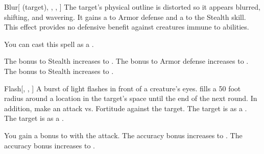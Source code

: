 \lowercase{\hypertarget{spell:Blur}{}}\label{spell:Blur}
\begin{attuneability}[Rank 1]{\hypertarget{spell:Blur}{Blur}}[ (target), , , ]
The target's physical outline is distorted so it appears blurred, shifting, and wavering.
It gains a   to Armor defense and a   to the Stealth skill.
This effect provides no defensive benefit against creatures immune to  abilities.

You can cast this spell as a .

\rankline
{} The bonus to Stealth increases to .
 The bonus to Armor defense increases to .
 The bonus to Stealth increases to .
\end{attuneability}
\vspace{0.25em}



\lowercase{\hypertarget{spell:Flash}{}}\label{spell:Flash}
\begin{freeability}[Rank 1]{\hypertarget{spell:Flash}{Flash}}[, , ]
A burst of light flashes in front of a creature's eyes.
 fills a 50 foot radius around a location in the target's space until the end of the next round.
In addition, make an attack vs. Fortitude against the target.
\hit The target is  as a .
\crit The target is  as a .

\rankline
{} You gain a  bonus to  with the attack.
 The accuracy bonus increases to .
 The accuracy bonus increases to .
\end{freeability}
\vspace{0.25em}



